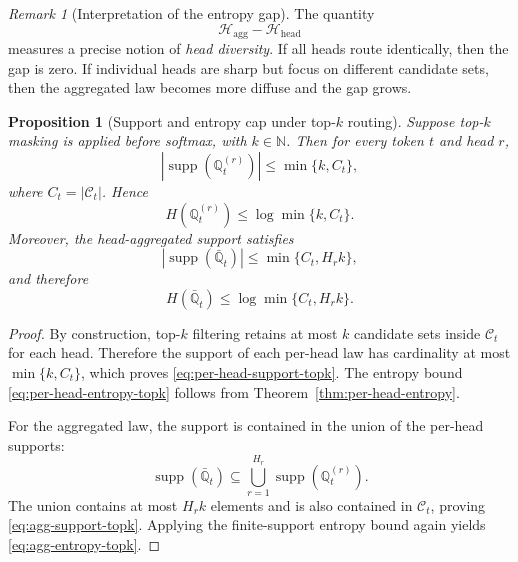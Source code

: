 \documentclass{article}
\theoremstyle{plain}
\newtheorem{proposition}[theorem]{Proposition}
\theoremstyle{definition}
\theoremstyle{remark}
\newtheorem{remark}[theorem]{Remark}
\begin{document}
\begin{remark}[Interpretation of the entropy gap]
\label{rem:entropy-gap-interpretation}
The quantity
\[
\mathcal{H}_{\mathrm{agg}}-\mathcal{H}_{\mathrm{head}}
\]
measures a precise notion of \emph{head diversity}. If all heads route identically, then the gap is zero. If individual heads are sharp but focus on different candidate sets, then the aggregated law becomes more diffuse and the gap grows.
\end{remark}

\begin{proposition}[Support and entropy cap under top-$k$ routing]
\label{prop:topk-support-entropy}
Suppose top-$k$ masking is applied before softmax, with $k\in \mathbb{N}$. Then for every token $t$ and head $r$,
\begin{equation}
\label{eq:per-head-support-topk}
\left| \operatorname{supp}\!\left(\mathbb{Q}^{(r)}_{t}\right)\right|
\le
\min\{k, C_{t}\},
\end{equation}
where $C_{t}=|\mathcal{C}_{t}|$. Hence
\begin{equation}
\label{eq:per-head-entropy-topk}
H\!\left(\mathbb{Q}^{(r)}_{t}\right)
\le
\log \min\{k,C_{t}\}.
\end{equation}
Moreover, the head-aggregated support satisfies
\begin{equation}
\label{eq:agg-support-topk}
\left| \operatorname{supp}(\bar{\mathbb{Q}}_{t})\right|
\le
\min\{C_{t}, H_r k\},
\end{equation}
and therefore
\begin{equation}
\label{eq:agg-entropy-topk}
H(\bar{\mathbb{Q}}_{t})
\le
\log \min\{C_{t}, H_r k\}.
\end{equation}
\end{proposition}

\begin{proof}
By construction, top-$k$ filtering retains at most $k$ candidate sets inside $\mathcal{C}_{t}$ for each head. Therefore the support of each per-head law has cardinality at most $\min\{k,C_{t}\}$, which proves \eqref{eq:per-head-support-topk}. The entropy bound \eqref{eq:per-head-entropy-topk} follows from Theorem~\ref{thm:per-head-entropy}.

For the aggregated law, the support is contained in the union of the per-head supports:
\[
\operatorname{supp}(\bar{\mathbb{Q}}_{t})
\subseteq
\bigcup_{r=1}^{H_r}
\operatorname{supp}\!\left(\mathbb{Q}^{(r)}_{t}\right).
\]
The union contains at most $H_r k$ elements and is also contained in $\mathcal{C}_{t}$, proving \eqref{eq:agg-support-topk}. Applying the finite-support entropy bound again yields \eqref{eq:agg-entropy-topk}.
\end{proof}
\end{document}
